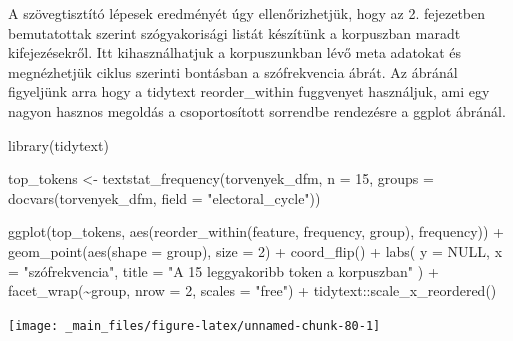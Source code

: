\documentclass[
]{book}
\newenvironment{Shaded}{\begin{snugshade}}{\end{snugshade}}
\newcommand{\AttributeTok}[1]{\textcolor[rgb]{0.77,0.63,0.00}{#1}}
\newcommand{\ConstantTok}[1]{\textcolor[rgb]{0.00,0.00,0.00}{#1}}
\newcommand{\DecValTok}[1]{\textcolor[rgb]{0.00,0.00,0.81}{#1}}
\newcommand{\FunctionTok}[1]{\textcolor[rgb]{0.00,0.00,0.00}{#1}}
\newcommand{\NormalTok}[1]{#1}
\newcommand{\OtherTok}[1]{\textcolor[rgb]{0.56,0.35,0.01}{#1}}
\newcommand{\SpecialCharTok}[1]{\textcolor[rgb]{0.00,0.00,0.00}{#1}}
\newcommand{\StringTok}[1]{\textcolor[rgb]{0.31,0.60,0.02}{#1}}
\begin{document}
A szövegtisztító lépesek eredményét úgy ellenőrizhetjük, hogy az 2.
fejezetben bemutatottak szerint szógyakorisági listát készítünk a
korpuszban maradt kifejezésekről. Itt kihasználhatjuk a korpuszunkban
lévő meta adatokat és megnézhetjük ciklus szerinti bontásban a
szófrekvencia ábrát. Az ábránál figyeljünk arra hogy a tidytext
reorder\_within fuggvenyet használjuk, ami egy nagyon hasznos megoldás a
csoportosított sorrendbe rendezésre a ggplot ábránál.

\begin{Shaded}
\begin{Highlighting}[]
\FunctionTok{library}\NormalTok{(tidytext)}
\end{Highlighting}
\end{Shaded}

\begin{Shaded}
\begin{Highlighting}[]


\NormalTok{top\_tokens }\OtherTok{\textless{}{-}} \FunctionTok{textstat\_frequency}\NormalTok{(torvenyek\_dfm, }\AttributeTok{n =} \DecValTok{15}\NormalTok{, }\AttributeTok{groups =} \FunctionTok{docvars}\NormalTok{(torvenyek\_dfm, }\AttributeTok{field =} \StringTok{"electoral\_cycle"}\NormalTok{))}

\FunctionTok{ggplot}\NormalTok{(top\_tokens, }\FunctionTok{aes}\NormalTok{(}\FunctionTok{reorder\_within}\NormalTok{(feature, frequency, group), frequency)) }\SpecialCharTok{+}
  \FunctionTok{geom\_point}\NormalTok{(}\FunctionTok{aes}\NormalTok{(}\AttributeTok{shape =}\NormalTok{ group), }\AttributeTok{size =} \DecValTok{2}\NormalTok{) }\SpecialCharTok{+}
  \FunctionTok{coord\_flip}\NormalTok{() }\SpecialCharTok{+}
  \FunctionTok{labs}\NormalTok{(}
    \AttributeTok{y =} \ConstantTok{NULL}\NormalTok{,}
    \AttributeTok{x =} \StringTok{"szófrekvencia"}\NormalTok{,}
    \AttributeTok{title =} \StringTok{"A 15 leggyakoribb token a korpuszban"}
\NormalTok{  ) }\SpecialCharTok{+}
  \FunctionTok{facet\_wrap}\NormalTok{(}\SpecialCharTok{\textasciitilde{}}\NormalTok{group, }\AttributeTok{nrow =} \DecValTok{2}\NormalTok{, }\AttributeTok{scales =} \StringTok{"free"}\NormalTok{) }\SpecialCharTok{+}
\NormalTok{  tidytext}\SpecialCharTok{::}\FunctionTok{scale\_x\_reordered}\NormalTok{()}
\end{Highlighting}
\end{Shaded}

\begin{center}\texttt{[image: \_main\_files/figure-latex/unnamed-chunk-80-1]} \end{center}
\end{document}
